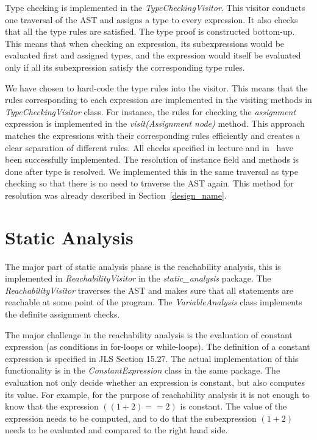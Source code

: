 \documentclass[a4paper, notitlepage]{report}
\begin{document}
Type checking is implemented in the \emph{TypeCheckingVisitor}. This visitor conducts one traversal of the AST and assigns a type to every expression. It also checks that all the type rules are satisfied. The type proof is constructed bottom-up. This means that when checking an expression, its subexpressions would be evaluated first and assigned types, and the expression would itself be evaluated only if all its subexpression satisfy the corresponding type rules.

We have chosen to hard-code the type rules into the visitor. This means that the rules corresponding to each expression are implemented in the visiting methods in \emph{TypeCheckingVisitor} class. For instance, the rules for checking the \emph{assignment} expression is implemented in the \emph{visit(Assignment node)} method. This approach matches the expressions with their corresponding rules efficiently and creates a clear separation of different rules. All checks specified in lecture and in~\cite{a3} have been successfully implemented. The resolution of instance field and methods is done after type is resolved. We implemented this in the same traversal as type checking so that there is no need to traverse the AST again. This method for resolution was already described in Section~\ref{design_name}.

\section{Static Analysis}

The major part of static analysis phase is the reachability analysis, this is implemented in \emph{ReachabilityVisitor} in the \emph{static\_analysis} package. The \emph{ReachabilityVisitor} traverses the AST and makes sure that all statements are reachable at some point of the program. The \emph{VariableAnalysis} class  implements the definite assignment checks.

The major challenge in the reachability analysis is the evaluation of constant expression (as conditions in for-loops or while-loops). The definition of a constant expression is specified in JLS Section 15.27. The actual implementation of this functionality is in the \emph{ConstantExpression} class in the same package. The evaluation not only decide whether an expression is constant, but also computes its value. For example, for the purpose of reachability analysis it is not enough to know that the expression $((1+2) == 2)$  is constant. The value of the expression needs to be computed, and to do that the subexpression $(1+2)$ needs to be evaluated and compared to the right hand side.
\end{document}
